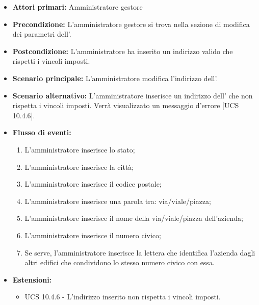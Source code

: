 \begin{itemize}
	\item \textbf{Attori primari:} Amministratore gestore
	\item \textbf{Precondizione:} L'amministratore gestore si trova nella sezione di modifica dei parametri dell'.
	\item \textbf{Postcondizione:} L'amministratore ha inserito un indirizzo valido che rispetti i vincoli imposti.
	\item \textbf{Scenario principale:} L'amministratore modifica l'indirizzo dell'.
	\item \textbf{Scenario alternativo:} L'amministratore inserisce un indirizzo dell' che non rispetta i vincoli imposti. Verrà visualizzato un messaggio d'errore [UCS 10.4.6].
	\item \textbf{Flusso di eventi:}
	\begin{enumerate}
		\item L'amministratore inserisce lo stato;
		\item L'amministratore inserisce la città;
		\item L'amministratore inserisce il codice postale;
		\item L'amministratore inserisce una parola tra: via/viale/piazza;
		\item L'amministratore inserisce il nome della via/viale/piazza dell'azienda;
		\item L'amministratore inserisce il numero civico;
		\item Se serve, l'amministratore inserisce la lettera che identifica l'azienda dagli altri edifici che condividono lo stesso numero civico con essa.
	\end{enumerate}
	\item \textbf{Estensioni:}
	\begin{itemize}
		\item UCS 10.4.6 - L'indirizzo inserito non rispetta i vincoli imposti.
	\end{itemize}
\end{itemize}

